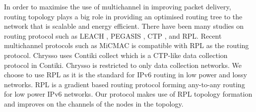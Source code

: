 In order to maximise the use of multichannel in improving packet delivery, routing topology plays a big role in providing an optimised routing tree to the network that is scalable and energy efficient. There have been many studies on routing protocol such as LEACH \cite{leach}, PEGASIS \cite{pegasis}, CTP \cite{ctp}, and RPL. Recent multichannel protocols such as MiCMAC is compatible with RPL as the routing protocol. Chrysso uses Contiki collect which is a CTP-like data collection protocol in Contiki. Chrysso is restricted to only data collection networks. We choose to use RPL as it is the standard for IPv6 routing in low power and lossy networks. RPL \cite{winter2012rpl, routingmetrics, mrhof} is a gradient based routing protocol forming any-to-any routing for low power IPv6 networks. 
Our protocol makes use of RPL topology formation and improves on the channels of the nodes in the topology.